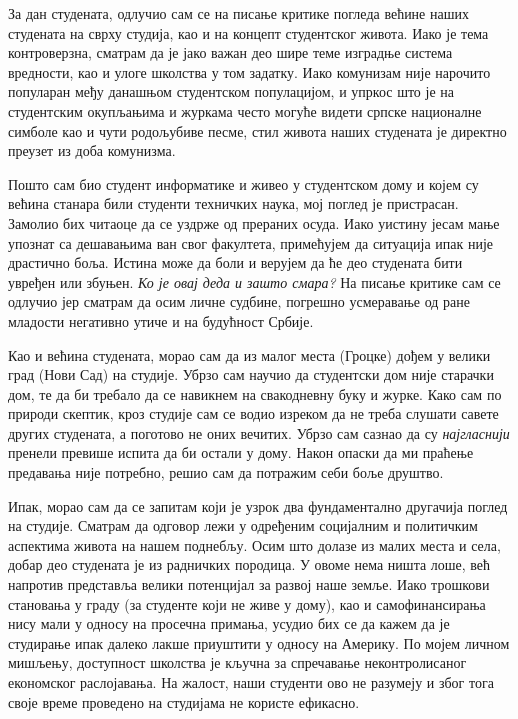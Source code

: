 \documentclass[b5paper]{article}
\begin{document}
\large

За дан студената, одлучио сам се на писање критике погледа већине наших студената на сврху студија, као и на концепт студентског живота. Иако је тема контроверзна, сматрам да је јако важан део шире теме изградње система вредности, као и улоге школства у том задатку. Иако комунизам није нарочито популаран међу данашњом студентском популацијом, и упркос што је на студентским окупљањима и журкама често могуће видети српске националне симболе као и чути родољубиве песме, стил живота наших студената је директно преузет из доба комунизма.

Пошто сам био студент информатике и живео у студентском дому и којем су већина станара били студенти техничких наука, мој поглед је пристрасан. Замолио бих читаоце да се уздрже од прераних осуда. Иако уистину јесам мање упознат са дешавањима ван свог факултета, примећујем да ситуација ипак није драстично боља. Истина може да боли и верујем да ће део студената бити увређен или збуњен. \textit{Ко је овај деда и зашто смара?} На писање критике сам се одлучио јер сматрам да осим личне судбине, погрешно усмеравање од ране младости негативно утиче и на будућност Србије.

Као и већина студената, морао сам да из малог места (Гроцке) дођем у велики град (Нови Сад) на студије. Убрзо сам научио да студентски дом није старачки дом, те да би требало да се навикнем на свакодневну буку и журке. Како сам по природи скептик, кроз студије сам се водио изреком да не треба слушати савете других студената, а поготово не оних вечитих. Убрзо сам сазнао да су \textit{најгласнији} пренели превише испита да би остали у дому. Након опаски да ми праћење предавања није потребно, решио сам да потражим себи боље друштво.

Ипак, морао сам да се запитам који је узрок два фундаментално другачија поглед на студије. Сматрам да одговор лежи у одређеним социјалним и политичким аспектима живота на нашем поднебљу. Осим што долазе из малих места и села, добар део студената је из радничких породица. У овоме нема ништа лоше, већ напротив представља велики потенцијал за развој наше земље. Иако трошкови становања у граду (за студенте који не живе у дому), као и самофинансирања нису мали у односу на просечна примања, усудио бих се да кажем да је студирање ипак далеко лакше приуштити у односу на Америку. По мојем личном мишљењу, доступност школства је кључна за спречавање неконтролисаног економског раслојавања. На жалост, наши студенти ово не разумеју и због тога своје време проведено на студијама не користе ефикасно.
\end{document}
